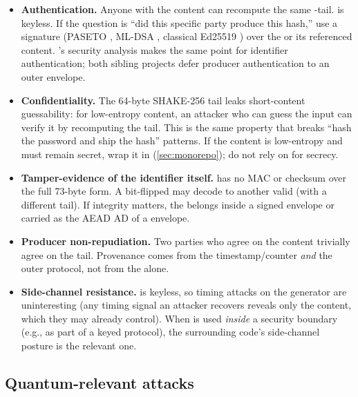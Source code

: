 \begin{itemize}
  \item \textbf{Authentication.} Anyone with the content can recompute the same \tesserahash{}-tail. \tesserahash{} is keyless. If the question is ``did this specific party produce this hash,'' use a signature (PASETO \citep{paseto-v4}, ML-DSA \citep{fips204}, classical Ed25519 \citep{rfc8032}) over the \tesserahash{} or its referenced content. \tesseraid{}'s security analysis makes the same point for identifier authentication; both sibling projects defer producer authentication to an outer envelope.
  \item \textbf{Confidentiality.} The 64-byte SHAKE-256 tail leaks short-content guessability: for low-entropy content, an attacker who can guess the input can verify it by recomputing the tail. This is the same property that breaks ``hash the password and ship the hash'' patterns. If the content is low-entropy and must remain secret, wrap it in \tesseraseal{} (\cref{sec:monorepo}); do not rely on \tesserahash{} for secrecy.
  \item \textbf{Tamper-evidence of the identifier itself.} \tesserahash{} has no MAC or checksum over the full 73-byte form. A bit-flipped \tesserahash{} may decode to another valid \tesserahash{} (with a different tail). If integrity matters, the \tesserahash{} belongs inside a signed envelope or carried as the AEAD AD of a \tesseraseal{} envelope.
  \item \textbf{Producer non-repudiation.} Two parties who agree on the content trivially agree on the tail. Provenance comes from the timestamp/counter \emph{and} the outer protocol, not from the \tesserahash{} alone.
  \item \textbf{Side-channel resistance.} \tesserahash{} is keyless, so timing attacks on the generator are uninteresting (any timing signal an attacker recovers reveals only the content, which they may already control). When \tesserahash{} is used \emph{inside} a security boundary (e.g., as part of a keyed protocol), the surrounding code's side-channel posture is the relevant one.
\end{itemize}

\subsection{Quantum-relevant attacks}


